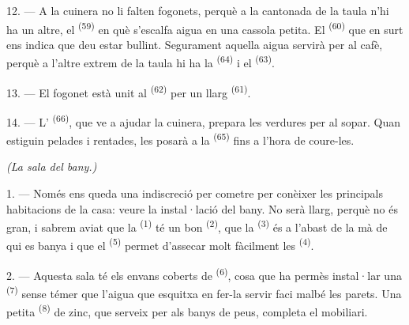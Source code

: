 12. --- A la cuinera no li falten fogonets, perquè a la cantonada de la taula n'hi ha un
altre, el  \textsuperscript{(59)} en què s'escalfa aigua en una cassola
petita. El  \textsuperscript{(60)} que en surt ens indica que deu estar bullint.
Segurament aquella aigua servirà per al cafè, perquè a l'altre extrem de la taula hi ha la
 \textsuperscript{(64)} i el  \textsuperscript{(63)}.

13. --- El fogonet està unit al  \textsuperscript{(62)} per un llarg
 \textsuperscript{(61)}.

14. --- L' \textsuperscript{(66)}, que ve a ajudar la cuinera, prepara les
verdures per al sopar. Quan estiguin pelades i rentades, les posarà a la 
\textsuperscript{(65)} fins a l'hora de coure-les.

\VUsaut{4.0mm}
{\centering\fontsize{10.2pt}{10.2pt}\selectfont{} \textit{(La sala del bany.)}\par}
\VUsaut{3.0mm}

1. --- Només ens queda una indiscreció per cometre per conèixer les principals habitacions de
la casa: veure la instal·lació del bany. No serà llarg, perquè no és gran, i sabrem aviat que
la  \textsuperscript{(1)} té un bon
 \textsuperscript{(2)}, que la 
\textsuperscript{(3)} és a l'abast de la mà de qui es banya i que el
 \textsuperscript{(5)} permet d'assecar molt fàcilment les
 \textsuperscript{(4)}.

2. --- Aquesta sala té els envans coberts de  \textsuperscript{(6)}, cosa que
ha permès instal·lar una  \textsuperscript{(7)} sense témer que l'aigua que
esquitxa en fer-la servir faci malbé les parets. Una petita 
\textsuperscript{(8)} de zinc, que serveix per als banys de peus, completa el mobiliari.
\VUsaut{6.0mm}
\VUfilet{22mm}
